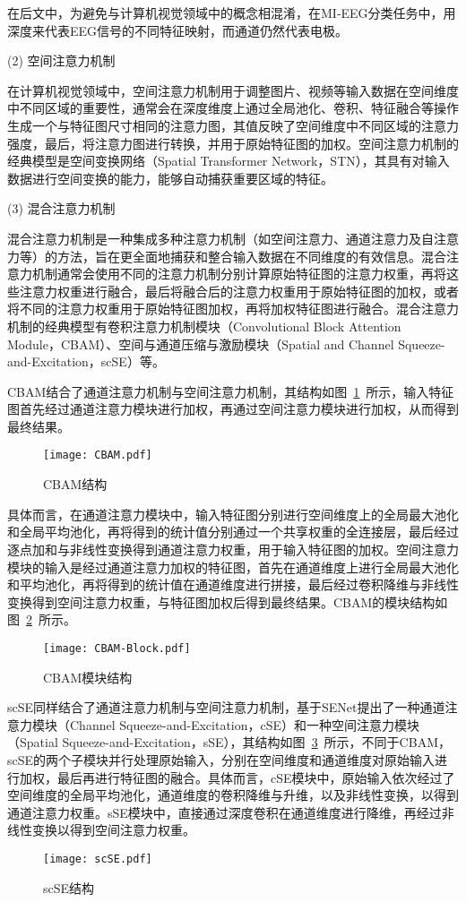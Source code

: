在后文中，为避免与计算机视觉领域中的概念相混淆，在MI-EEG分类任务中，用深度来代表EEG信号的不同特征映射，而通道仍然代表电极。

(2) 空间注意力机制
    
在计算机视觉领域中，空间注意力机制用于调整图片、视频等输入数据在空间维度中不同区域的重要性，通常会在深度维度上通过全局池化、卷积、特征融合等操作生成一个与特征图尺寸相同的注意力图，其值反映了空间维度中不同区域的注意力强度，最后，将注意力图进行转换，并用于原始特征图的加权。空间注意力机制的经典模型是空间变换网络（Spatial Transformer Network，STN）\cite{jaderberg2015spatial}，其具有对输入数据进行空间变换的能力，能够自动捕获重要区域的特征。

(3) 混合注意力机制
    
混合注意力机制是一种集成多种注意力机制（如空间注意力、通道注意力及自注意力等）的方法，旨在更全面地捕获和整合输入数据在不同维度的有效信息。混合注意力机制通常会使用不同的注意力机制分别计算原始特征图的注意力权重，再将这些注意力权重进行融合，最后将融合后的注意力权重用于原始特征图的加权，或者将不同的注意力权重用于原始特征图加权，再将加权特征图进行融合。混合注意力机制的经典模型有卷积注意力机制模块（Convolutional Block Attention Module，CBAM）\cite{woo2018cbam}、空间与通道压缩与激励模块（Spatial and Channel Squeeze-and-Excitation，scSE）\cite{roy2018concurrent}等。
    
CBAM结合了通道注意力机制与空间注意力机制，其结构如图~\ref{fig:CBAM}~所示，输入特征图首先经过通道注意力模块进行加权，再通过空间注意力模块进行加权，从而得到最终结果。
\begin{figure}
    \centering
    \texttt{[image: CBAM.pdf]}
    \caption{CBAM结构}
    \label{fig:CBAM}
\end{figure}

具体而言，在通道注意力模块中，输入特征图分别进行空间维度上的全局最大池化和全局平均池化，再将得到的统计值分别通过一个共享权重的全连接层，最后经过逐点加和与非线性变换得到通道注意力权重，用于输入特征图的加权。空间注意力模块的输入是经过通道注意力加权的特征图，首先在通道维度上进行全局最大池化和平均池化，再将得到的统计值在通道维度进行拼接，最后经过卷积降维与非线性变换得到空间注意力权重，与特征图加权后得到最终结果。CBAM的模块结构如图~\ref{fig:CBAM-Block}~所示。
\begin{figure}
  \centering
  \texttt{[image: CBAM-Block.pdf]}
  \caption{CBAM模块结构}
  \label{fig:CBAM-Block}
\end{figure}

scSE同样结合了通道注意力机制与空间注意力机制，基于SENet提出了一种通道注意力模块（Channel Squeeze-and-Excitation，cSE）和一种空间注意力模块（Spatial Squeeze-and-Excitation，sSE），其结构如图~\ref{fig:scSE}~所示，不同于CBAM，scSE的两个子模块并行处理原始输入，分别在空间维度和通道维度对原始输入进行加权，最后再进行特征图的融合。具体而言，cSE模块中，原始输入依次经过了空间维度的全局平均池化，通道维度的卷积降维与升维，以及非线性变换，以得到通道注意力权重。sSE模块中，直接通过深度卷积在通道维度进行降维，再经过非线性变换以得到空间注意力权重。
\begin{figure}
    \centering
    \texttt{[image: scSE.pdf]}
    \caption{scSE结构}
    \label{fig:scSE}
\end{figure}

